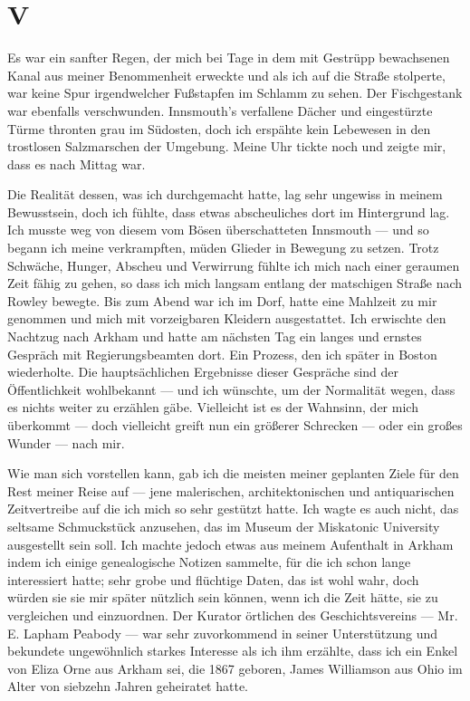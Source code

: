 \chapter*{V}

Es war ein sanfter Regen, der mich bei Tage in dem mit Gestrüpp bewachsenen Kanal aus meiner Benommenheit erweckte und als ich auf die Straße stolperte, war keine Spur irgendwelcher Fußstapfen im Schlamm zu sehen. Der Fischgestank war ebenfalls verschwunden. Innsmouth's verfallene Dächer und eingestürzte Türme thronten grau im Südosten, doch ich erspähte kein Lebewesen in den trostlosen Salzmarschen der Umgebung. Meine Uhr tickte noch und zeigte mir, dass es nach Mittag war.

Die Realität dessen, was ich durchgemacht hatte, lag sehr ungewiss in meinem Bewusstsein, doch ich fühlte, dass etwas abscheuliches dort im Hintergrund lag. Ich musste weg von diesem vom Bösen überschatteten Innsmouth --- und so begann ich meine verkrampften, müden Glieder in Bewegung zu setzen. Trotz Schwäche, Hunger, Abscheu und Verwirrung fühlte ich mich nach einer geraumen Zeit fähig zu gehen, so dass ich mich langsam entlang der matschigen Straße nach Rowley bewegte. Bis zum Abend war ich im Dorf, hatte eine Mahlzeit zu mir genommen und mich mit vorzeigbaren Kleidern ausgestattet. Ich erwischte den Nachtzug nach Arkham und hatte am nächsten Tag ein langes und ernstes Gespräch mit Regierungsbeamten dort. Ein Prozess, den ich später in Boston wiederholte. Die hauptsächlichen Ergebnisse dieser Gespräche sind der Öffentlichkeit wohlbekannt --- und ich wünschte, um der Normalität wegen, dass es nichts weiter zu erzählen gäbe. Vielleicht ist es der Wahnsinn, der mich überkommt --- doch vielleicht greift nun ein größerer Schrecken --- oder ein großes Wunder --- nach mir.

Wie man sich vorstellen kann, gab ich die meisten meiner geplanten Ziele für den Rest meiner Reise auf --- jene malerischen, architektonischen und antiquarischen Zeitvertreibe auf die ich mich so sehr gestützt hatte. Ich wagte es auch nicht, das seltsame Schmuckstück anzusehen, das im Museum der Miskatonic University ausgestellt sein soll. Ich machte jedoch etwas aus meinem Aufenthalt in Arkham indem ich einige genealogische Notizen sammelte, für die ich schon lange interessiert hatte; sehr grobe und flüchtige Daten, das ist wohl wahr, doch würden sie sie mir später nützlich sein können, wenn ich die Zeit hätte, sie zu vergleichen und einzuordnen. Der Kurator örtlichen des Geschichtsvereins --- Mr. E. Lapham Peabody --- war sehr zuvorkommend in seiner Unterstützung und bekundete ungewöhnlich starkes Interesse als ich ihm erzählte, dass ich ein Enkel von Eliza Orne aus Arkham sei, die 1867 geboren, James Williamson aus Ohio im Alter von siebzehn Jahren geheiratet hatte.

